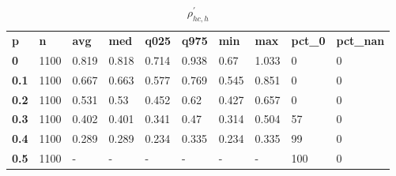\begin{table}[h]
 \centering 
\footnotesize
\caption{$\rho_{hc,h}^\prime $}
\label{tab:alphahch}
\begin{tabular}[h]{| l l l l l l l l l l|
    } \hline
\textbf{ p} & \textbf{ n} & \textbf{ avg} & \textbf{ med} & \textbf{ q025} & \textbf{ q975} & \textbf{ min} & \textbf{ max} & \textbf{ pct\_0} & \textbf{ pct\_nan}
           \\
  \textbf{  0} & 1100 & 0.819 & 0.818 & 0.714 & 0.938 &  0.67 & 1.033 &   0 & 0
           \\
  \textbf{0.1} & 1100 & 0.667 & 0.663 & 0.577 & 0.769 & 0.545 & 0.851 &   0 & 0
           \\
  \textbf{0.2} & 1100 & 0.531 &  0.53 & 0.452 &  0.62 & 0.427 & 0.657 &   0 & 0
           \\
  \textbf{0.3} & 1100 & 0.402 & 0.401 & 0.341 &  0.47 & 0.314 & 0.504 &  57 & 0
           \\
  \textbf{0.4} & 1100 & 0.289 & 0.289 & 0.234 & 0.335 & 0.234 & 0.335 &  99 & 0
           \\
  \textbf{0.5} & 1100 & - & - & - & - & - & - & 100 & 0
           \\
 \hline \end{tabular}
 \end{table}
